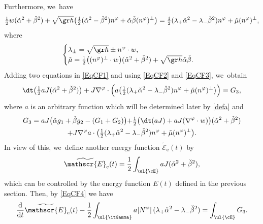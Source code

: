 Furthermore, we~have
\begin{equation}\label{EqCF3}
\tfrac12w(\check{\alpha}^2+\check{\beta}^2) + \sqrt{\gr h}\bigl(\tfrac12(\check{\alpha}^2-\check{\beta}^2)n^\varphi + \check{\alpha}\check{\beta}(n^\varphi)^\perp\bigr)
= \tfrac12(\lambda_+\check{\alpha}^2-\lambda_-\check{\beta}^2)n^\varphi + \check{\mu}(n^\varphi)^\perp,
\end{equation}
where
\[
\begin{cases}
\lambda_{\pm} = \sqrt{\gr h}\pm n^\varphi\cdot w, \\
\check{\mu} = \tfrac12\bigl((n^\varphi)^\perp\cdot w\bigr)(\check{\alpha}^2+\check{\beta}^2) + \sqrt{\gr h}\check{\alpha}\check{\beta}.
\end{cases}
\]
Adding two equations in \eqref{EqCF1} and using \eqref{EqCF2} and \eqref{EqCF3}, we~obtain
\begin{equation}\label{EqCF4}
\dt \bigl(\tfrac12aJ(\check{\alpha}^2+\check{\beta}^2) \bigr)
+ J\nabla^\varphi\cdot\Bigl(a \bigl(\tfrac12(\lambda_+\check{\alpha}^2-\lambda_-\check{\beta}^2)n^\varphi + \check{\mu}(n^\varphi)^\perp \bigr) \Bigr) = G_3,
\end{equation}
where $a$ is an arbitrary function which will be determined later by \eqref{defa} and
\begin{multline*}
G_3
= aJ \bigl(\check{\alpha}g_1+\check{\beta}g_2-(G_1+G_2) \bigl) + \tfrac12 \bigl(\dt(aJ)+aJ(\nabla^\varphi\cdot w) \bigr)(\check{\alpha}^2+\check{\beta}^2) \\
+ J\nabla^\varphi a \cdot \bigl(\tfrac12(\lambda_+\check{\alpha}^2-\lambda_-\check{\beta}^2)n^\varphi + \check{\mu}(n^\varphi)^\perp \bigr).
\end{multline*}
In view of this, we~define another energy function $\widetilde{\mathscr{E}}_\mathrm{e}(t)$ by
\begin{equation}\label{defEF2}
\widetilde{\mathscr{E}}_\mathrm{e}(t) = \frac12\int_{\ul{\cE}}aJ(\check{\alpha}^2+\check{\beta}^2),
\end{equation}
which can be controlled by the energy function $E(t)$ defined in the previous section.
Then, by \eqref{EqCF4} we have
\begin{equation}\label{EqCF5}
\frac{\rm d}{{\rm d}t}\widetilde{\mathscr{E}}_\mathrm{e}(t) - \frac12\int_{\ul{\itGamma}} a|N^\varphi|\,(\lambda_+\check{\alpha}^2-\lambda_-\check{\beta}^2)
= \int_{\ul{\cE}}G_3.
\end{equation}

